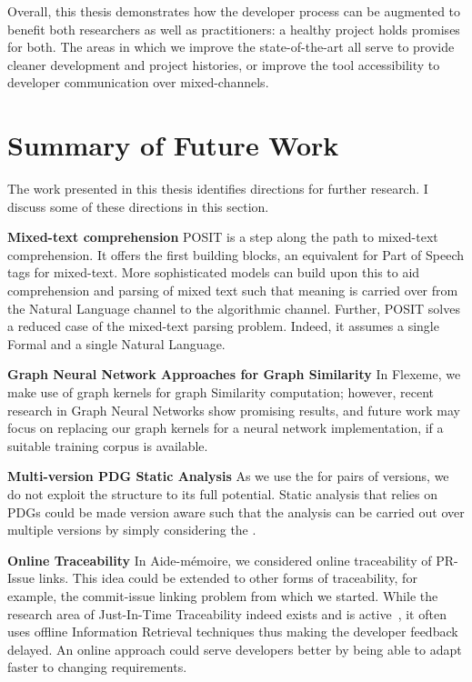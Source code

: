 Overall, this thesis demonstrates how the developer process can be augmented to
benefit both researchers as well as practitioners: a healthy project holds
promises for both. The areas in which we improve the state-of-the-art all serve
to provide cleaner development and project histories, or improve the tool
accessibility to developer communication over mixed-channels. 

\section{Summary of Future Work}
The work presented in this thesis identifies directions for further research. I discuss some of these directions in this section.

\textbf{Mixed-text comprehension}
POSIT is a step along the path to mixed-text comprehension. It offers the first
building blocks, an equivalent for Part of Speech tags for mixed-text. More
sophisticated models can build upon this to aid comprehension and parsing of
mixed text such that meaning is carried over from the Natural Language channel
to the algorithmic channel. Further, POSIT solves a reduced case of the
mixed-text parsing problem. Indeed, it assumes a single Formal and a single
Natural Language. 

\textbf{Graph Neural Network Approaches for Graph Similarity}
In Flexeme, we make use of graph kernels for graph Similarity computation;
however, recent research in Graph Neural Networks show promising results, and
future work may focus on replacing our graph kernels for a neural network
implementation, if a suitable training corpus is available.

\textbf{Multi-version PDG Static Analysis}
As we use the \deltaPDG for pairs of versions, we do not exploit the structure
to its full potential. Static analysis that relies on PDGs could be made version
aware such that the analysis can be carried out over multiple versions by simply
considering the \deltaPDG.

\textbf{Online Traceability}
In Aide-mémoire, we considered online traceability of PR-Issue links. This idea
could be extended to other forms of traceability, for example, the commit-issue
linking problem from which we started. While the research area of Just-In-Time
Traceability indeed exists and is active~\cite{hayes2003improving,
lin2006poirot, lucia2007recovering, cleland2007best}, it often uses offline
Information Retrieval techniques thus making the developer feedback delayed. An
online approach could serve developers better by being able to adapt faster to
changing requirements.
